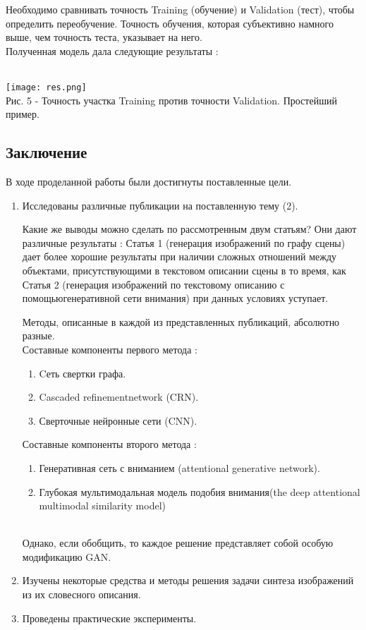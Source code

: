 \documentclass{article}
\begin{document}
Необходимо сравнивать точность Training (обучение) и Validation (тест), чтобы определить переобучение. Точность обучения, которая субъективно намного выше, чем точность теста, указывает на него.\\
      Полученная модель дала следующие результаты :\\ \\
      \begin{center} 
      \texttt{[image: res.png]}
      \\
      \caption*{Рис. 5 - Точность участка Training  против точности Validation. Простейший пример.}
      \end{center} 
\newpage
    \begin{center} 
    \section{Заключение}
    \end{center} 
      \large В ходе проделанной работы были достигнуты поставленные цели.
      \begin{enumerate} 
\item Исследованы различные публикации на поставленную тему (2).

Какие же выводы можно сделать по рассмотренным двум статьям? Они дают различные результаты : Статья 1 (генерация изображений по графу сцены) дает более хорошие результаты при наличии сложных отношений между объектами, присутствующими в текстовом описании сцены в то время, как Статья 2 (генерация изображений по текстовому описанию с помощьюгенеративной сети внимания) при данных условиях уступает.

Методы, описанные в каждой из представленных публикаций, абсолютно разные.\\

Составные компоненты первого метода :
    \begin{enumerate}
\item Cеть свертки графа.
\item Cascaded refinementnetwork (CRN).
\item Сверточные нейронные сети (CNN).
    \end{enumerate} 
    
Составные компоненты второго метода :
    \begin{enumerate}
\item Генеративная сеть с вниманием (attentional generative network).
\item Глубокая мультимодальная модель подобия внимания(the deep attentional multimodal similarity model)
    \end{enumerate} \\
    Однако, если обобщить, то каждое решение представляет собой особую модификацию GAN.
\item Изучены некоторые средства и методы решения задачи синтеза изображений из их словесного описания.
\item Проведены практические эксперименты.\\
    \end{enumerate} 
\end{document}
